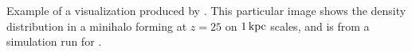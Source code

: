 \label{fig:vis}
Example of a visualization produced by .  This particular image shows the density distribution in a minihalo forming at $z=25$ on $1\,{\rm kpc}$ scales, and is from a simulation run for \citep{Hummeletal2015}.